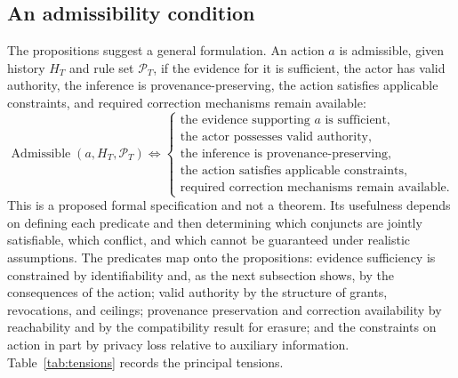 \documentclass[11pt]{article}
\theoremstyle{plain}
\theoremstyle{definition}
\theoremstyle{remark}
\newcommand{\Adm}{\operatorname{Admissible}}
\begin{document}
\subsection{An admissibility condition}

The propositions suggest a general formulation. An action $a$ is admissible, given history $H_T$ and rule set $\mathcal{P}_T$, if the evidence for it is sufficient, the actor has valid authority, the inference is provenance-preserving, the action satisfies applicable constraints, and required correction mechanisms remain available:
\[
\Adm(a,H_T,\mathcal{P}_T)
\iff
\begin{cases}
\text{the evidence supporting }a\text{ is sufficient},\\
\text{the actor possesses valid authority},\\
\text{the inference is provenance-preserving},\\
\text{the action satisfies applicable constraints},\\
\text{required correction mechanisms remain available}.
\end{cases}
\]
This is a proposed formal specification and not a theorem. Its usefulness depends on defining each predicate and then determining which conjuncts are jointly satisfiable, which conflict, and which cannot be guaranteed under realistic assumptions. The predicates map onto the propositions: evidence sufficiency is constrained by identifiability and, as the next subsection shows, by the consequences of the action; valid authority by the structure of grants, revocations, and ceilings; provenance preservation and correction availability by reachability and by the compatibility result for erasure; and the constraints on action in part by privacy loss relative to auxiliary information. Table~\ref{tab:tensions} records the principal tensions.
\end{document}
